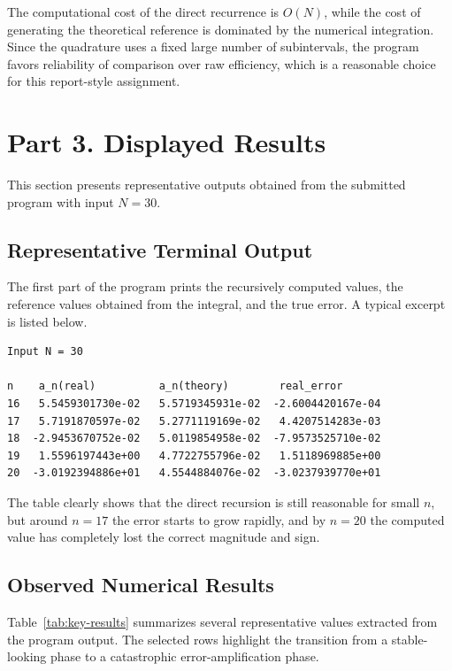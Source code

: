 \documentclass[12pt,a4paper]{article}
\begin{document}
The computational cost of the direct recurrence is $O(N)$, while the cost of generating the theoretical reference is dominated by the numerical integration. Since the quadrature uses a fixed large number of subintervals, the program favors reliability of comparison over raw efficiency, which is a reasonable choice for this report-style assignment.

\section{Part 3. Displayed Results}

This section presents representative outputs obtained from the submitted program with input $N=30$.

\subsection*{Representative Terminal Output}

The first part of the program prints the recursively computed values, the reference values obtained from the integral, and the true error. A typical excerpt is listed below.

\begin{lstlisting}
Input N = 30

n    a_n(real)          a_n(theory)        real_error
16   5.5459301730e-02   5.5719345931e-02  -2.6004420167e-04
17   5.7191870597e-02   5.2771119169e-02   4.4207514283e-03
18  -2.9453670752e-02   5.0119854958e-02  -7.9573525710e-02
19   1.5596197443e+00   4.7722755796e-02   1.5118969885e+00
20  -3.0192394886e+01   4.5544884076e-02  -3.0237939770e+01
\end{lstlisting}

The table clearly shows that the direct recursion is still reasonable for small $n$, but around $n=17$ the error starts to grow rapidly, and by $n=20$ the computed value has completely lost the correct magnitude and sign.

\subsection*{Observed Numerical Results}

Table~\ref{tab:key-results} summarizes several representative values extracted from the program output. The selected rows highlight the transition from a stable-looking phase to a catastrophic error-amplification phase.
\end{document}
